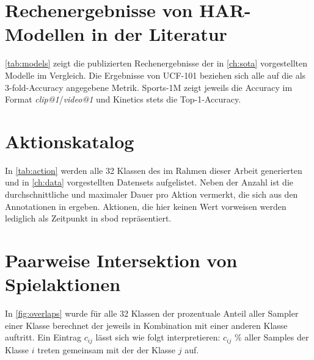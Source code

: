 \chapter{Rechenergebnisse von HAR-Modellen in der Literatur}
\label{ch:leaderboard}

\autoref{tab:models} zeigt die publizierten Rechenergebnisse der in \autoref{ch:sota} vorgestellten Modelle im Vergleich.
Die Ergebnisse von UCF-101 beziehen sich alle auf die als 3-fold-Accuracy angegebene Metrik.
Sports-1M zeigt jeweils die Accuracy im Format \emph{clip@1}/\emph{video@1} und Kinetics stets die Top-1-Accuracy.

\begin{figure}
    \label{tab:models}
\end{figure}

\chapter{Aktionskatalog}
\label{ch:aktionskatalog}

In \autoref{tab:action} werden alle 32 Klassen des im Rahmen dieser Arbeit generierten und in \autoref{ch:data} vorgestellten Datensets aufgelistet.
Neben der Anzahl ist die durchschnittliche und maximaler Dauer pro Aktion vermerkt, die sich aus den Annotationen in \cite{Statsbomb20} ergeben.
Aktionen, die hier keinen Wert vorweisen werden lediglich als Zeitpunkt in \gls{sbod} repräsentiert.

\begin{figure}
    \centering
    \begin{subfigure}{0.45\textwidth}
        \centering
    \end{subfigure}
    \begin{subfigure}{0.45\textwidth}
        \centering
    \end{subfigure}
    \label{tab:action}
\end{figure}

\chapter{Paarweise Intersektion von Spielaktionen}
\label{ch:overlaps}

In \autoref{fig:overlaps} wurde für alle 32 Klassen der prozentuale Anteil aller Sampler einer Klasse berechnet der jeweils in Kombination mit einer anderen Klasse auftritt.
Ein Eintrag $c_{ij}$ lässt sich wie folgt interpretieren:
$c_{ij}$ \% aller Samples der Klasse $i$ treten gemeinsam mit der der Klasse $j$ auf.

